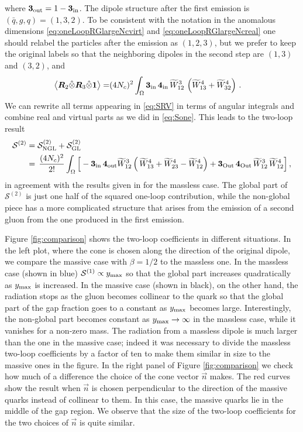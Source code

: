 \documentclass[11pt,a4paper]{article}
\def\nno{\nonumber}
\begin{document}
 where ${\bm 3}_{\rm out}= 1- {\bm 3}_{\rm in}$. 
 The dipole structure after the first emission is $(\bar{q},g,q) = (1,3,2)$. To be consistent with the notation in the anomalous dimensions \eqref{eq:oneLoopRGlargeNcvirt}  and \eqref{eq:oneLoopRGlargeNcreal} one should relabel the particles after the emission as $(1,2,3)$, but we prefer to keep the original labels so that the neighboring dipoles in the second step are $(1,3)$ and $(3,2)$, and
\begin{align}
\left\langle {\bm R_2}\hat{\otimes}  {\bm R_3}\hat{\otimes} {\bm 1} \right\rangle   =&(4 N_c)^2 \int_\Omega  {\bm 3}_{\rm in}\, {\bm 4}_{\rm in}\, \widetilde{W}_{12}^3 \,\left(\widetilde{W}_{13}^4 + \widetilde{W}_{32}^4 \right)   \, .
\end{align} 
We can rewrite all terms appearing in \eqref{eq:SRV} in terms of angular integrals and combine real and virtual parts as we did in \eqref{eq:Sone}. This leads to the two-loop result
\begin{align}\label{eq:fixedordercoeff}
\mathcal{S}^{(2)} &= \mathcal{S}_{\rm NGL} ^{(2)} + \mathcal{S}_{\rm GL} ^{(2)} \nno \\
&=  \, \frac{(4N_c)^2}{2!}  \int_{\Omega}\Big[ -{\bm 3}_{\rm in}\,{\bm 4}_{\rm out}  \widetilde{W}_{12}^3 \left(\,\widetilde{W}_{13}^4+ \widetilde{W}_{23}^4- \widetilde{W}_{12}^4\right) + {\bm 3}_{\rm Out}\,{\bm 4}_{\rm Out}\,\widetilde{W}_{12}^3\,\widetilde{W}_{12}^4\Big]\, ,
\end{align}
in agreement with the results given in \cite{Becher:2016mmh} for the massless case.
The global part of $\mathcal{S}^{(2)} $ is just one half of the squared one-loop contribution, while the non-global piece has a more complicated structure that arises from the emission of a second gluon from the one produced in the first emission. 

Figure \ref{fig:comparison} shows the two-loop coefficients in different situations. In the left plot, where the cone is chosen along the direction of the original dipole, we compare the massive case with $\beta=1/2$ to the massless one. In the massless case (shown in blue) $\mathcal{S}^{(1)} \propto y_{\rm max} $ so that the global part increases quadratically as $y_{\rm max}$ is increased. In the massive case (shown in black), on the other hand, the radiation stops as the gluon becomes collinear to the quark so that the global part of the gap fraction goes to a constant as $y_{\rm max}$ becomes large. Interestingly, the non-global part becomes constant as $y_{\rm max}\to \infty$ in the massless case, while it vanishes for a non-zero mass. The radiation from a massless dipole is much larger than the one in the massive case; indeed it was necessary to divide the massless two-loop coefficients by a factor of ten to make them similar in size to the massive ones in the figure. In the right panel of Figure \ref{fig:comparison} we check how much of a difference the choice of the cone vector $\vec{n}$ makes. The red curves show the result when $\vec{n}$ is chosen perpendicular to the direction of the massive quarks instead of collinear to them. In this case, the massive quarks lie in the middle of the gap region. We observe that the size of the two-loop coefficients for the two choices of $\vec{n}$ is quite similar.
\end{document}
